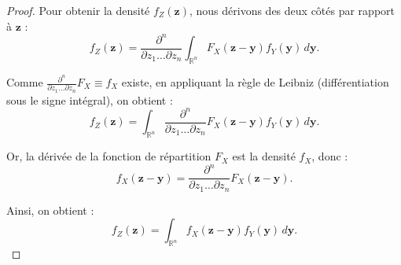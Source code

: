\documentclass[a4paper,10pt]{article}
\theoremstyle{definition} %
\theoremstyle{definition} %
\theoremstyle{definition} %
\theoremstyle{definition} %
\begin{document}
\begin{proof}
    Pour obtenir la densité \( f_Z(\mathbf{z}) \), nous dérivons des deux côtés par rapport à \( \mathbf{z} \) :
    \[
    f_Z(\mathbf{z}) = \frac{\partial^n}{\partial z_1 \dots \partial z_n} \int_{\mathbb{R}^n} F_X(\mathbf{z} - \mathbf{y}) f_Y(\mathbf{y}) \, d\mathbf{y}.
    \]
    
    Comme $\frac{\partial^n}{\partial z_1 \dots \partial z_n} F_X \equiv f_X$ existe, en appliquant la règle de Leibniz (différentiation sous le signe intégral), on obtient :
    \[
    f_Z(\mathbf{z}) = \int_{\mathbb{R}^n} \frac{\partial^n}{\partial z_1 \dots \partial z_n} F_X(\mathbf{z} - \mathbf{y}) f_Y(\mathbf{y}) \, d\mathbf{y}.
    \]
    
    Or, la dérivée de la fonction de répartition \( F_X \) est la densité \( f_X \), donc :
    \[
    f_X(\mathbf{z} - \mathbf{y}) = \frac{\partial^n}{\partial z_1 \dots \partial z_n} F_X(\mathbf{z} - \mathbf{y}).
    \]
    
    Ainsi, on obtient :
    \[
    f_Z(\mathbf{z}) = \int_{\mathbb{R}^n} f_X(\mathbf{z} - \mathbf{y}) f_Y(\mathbf{y}) \, d\mathbf{y}.
    \]
\end{proof}
\end{document}
